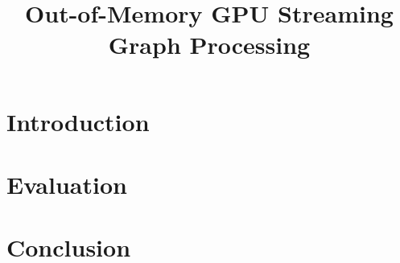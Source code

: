 \documentclass[conference]{IEEEtran}
\begin{document}
\title{Out-of-Memory GPU Streaming Graph Processing}
\author{}
\maketitle

\section{Introduction}





\section{Evaluation}

\section{Conclusion}
\end{document}

